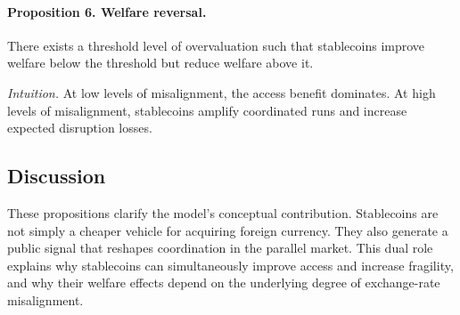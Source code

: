 \paragraph{Proposition 6. Welfare reversal.}
There exists a threshold level of overvaluation such that stablecoins improve welfare below the threshold but reduce welfare above it.

\emph{Intuition.} At low levels of misalignment, the access benefit dominates. At high levels of misalignment, stablecoins amplify coordinated runs and increase expected disruption losses.

\subsection{Discussion}

These propositions clarify the model's conceptual contribution. Stablecoins are not simply a cheaper vehicle for acquiring foreign currency. They also generate a public signal that reshapes coordination in the parallel market. This dual role explains why stablecoins can simultaneously improve access and increase fragility, and why their welfare effects depend on the underlying degree of exchange-rate misalignment.
